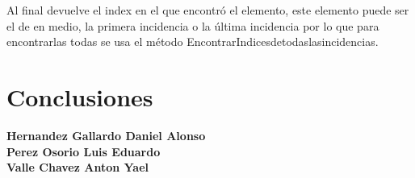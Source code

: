 \documentclass{report}
\begin{document}
Al final devuelve el index en el que encontró el elemento, este elemento puede ser el de en medio, la primera incidencia o la última incidencia por lo que para encontrarlas todas se usa el método EncontrarIndicesdetodaslasincidencias.






\chapter{Conclusiones}
\textbf{Hernandez Gallardo Daniel Alonso} \\
\newpage
\textbf{Perez Osorio Luis Eduardo} \\

\newpage
\textbf{Valle Chavez Anton Yael} \\
\newpage
\nocite{*}
  \newpage

\end{document}
